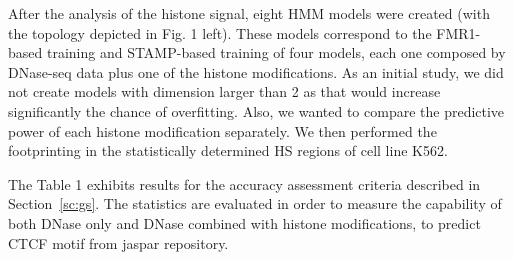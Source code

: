 \documentclass[runningheads,a4paper]{llncs}
\begin{document}
After the analysis of the histone signal, eight HMM models were created
(with the topology depicted in Fig. 1 left). These models
correspond to the FMR1-based training and STAMP-based training of four
models, each one composed by DNase-seq data plus one of the histone
modifications. As an initial study, we did not create models with
dimension larger than 2 as that would increase significantly the
chance of overfitting. Also, we wanted to compare the predictive power of
each histone modification separately. We then performed the
footprinting in the statistically determined HS regions of cell line
K562.

The Table 1 exhibits results for the accuracy assessment criteria described in Section~\ref{sc:gs}. 
The statistics are evaluated in order to measure the capability of both DNase only and DNase combined with histone modifications, to predict CTCF motif from jaspar repository. 
\end{document}
